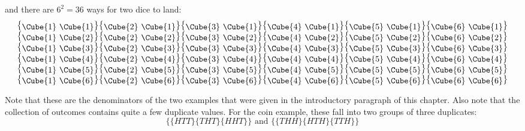 \noindent and there are $6^2=36$ ways for two dice to land:
\[
\begin{array}{c}
\mbox{ \big\{\raisebox{-2pt}{\Cube{1}
    \Cube{1}}\big\}\big\{\raisebox{-2pt}{\Cube{2}
    \Cube{1}}\big\}\big\{\raisebox{-2pt}{\Cube{3}
    \Cube{1}}\big\}\big\{\raisebox{-2pt}{\Cube{4}
    \Cube{1}}\big\}\big\{\raisebox{-2pt}{\Cube{5}
    \Cube{1}}\big\}\big\{\raisebox{-2pt}{\Cube{6} \Cube{1}}\big\}
}\\ \mbox{ \big\{\raisebox{-2pt}{\Cube{1}
    \Cube{2}}\big\}\big\{\raisebox{-2pt}{\Cube{2}
    \Cube{2}}\big\}\big\{\raisebox{-2pt}{\Cube{3}
    \Cube{2}}\big\}\big\{\raisebox{-2pt}{\Cube{4}
    \Cube{2}}\big\}\big\{\raisebox{-2pt}{\Cube{5}
    \Cube{2}}\big\}\big\{\raisebox{-2pt}{\Cube{6} \Cube{2}}\big\}
}\\ \mbox{ \big\{\raisebox{-2pt}{\Cube{1}
    \Cube{3}}\big\}\big\{\raisebox{-2pt}{\Cube{2}
    \Cube{3}}\big\}\big\{\raisebox{-2pt}{\Cube{3}
    \Cube{3}}\big\}\big\{\raisebox{-2pt}{\Cube{4}
    \Cube{3}}\big\}\big\{\raisebox{-2pt}{\Cube{5}
    \Cube{3}}\big\}\big\{\raisebox{-2pt}{\Cube{6} \Cube{3}}\big\}
}\\ \mbox{ \big\{\raisebox{-2pt}{\Cube{1}
    \Cube{4}}\big\}\big\{\raisebox{-2pt}{\Cube{2}
    \Cube{4}}\big\}\big\{\raisebox{-2pt}{\Cube{3}
    \Cube{4}}\big\}\big\{\raisebox{-2pt}{\Cube{4}
    \Cube{4}}\big\}\big\{\raisebox{-2pt}{\Cube{5}
    \Cube{4}}\big\}\big\{\raisebox{-2pt}{\Cube{6} \Cube{4}}\big\}
}\\ \mbox{ \big\{\raisebox{-2pt}{\Cube{1}
    \Cube{5}}\big\}\big\{\raisebox{-2pt}{\Cube{2}
    \Cube{5}}\big\}\big\{\raisebox{-2pt}{\Cube{3}
    \Cube{5}}\big\}\big\{\raisebox{-2pt}{\Cube{4}
    \Cube{5}}\big\}\big\{\raisebox{-2pt}{\Cube{5}
    \Cube{5}}\big\}\big\{\raisebox{-2pt}{\Cube{6} \Cube{5}}\big\}
}\\ \mbox{ \big\{\raisebox{-2pt}{\Cube{1}
    \Cube{6}}\big\}\big\{\raisebox{-2pt}{\Cube{2}
    \Cube{6}}\big\}\big\{\raisebox{-2pt}{\Cube{3}
    \Cube{6}}\big\}\big\{\raisebox{-2pt}{\Cube{4}
    \Cube{6}}\big\}\big\{\raisebox{-2pt}{\Cube{5}
    \Cube{6}}\big\}\big\{\raisebox{-2pt}{\Cube{6} \Cube{6}}\big\}
}
\end{array}\]
    
Note that these are the denominators of the two examples that were
given in the introductory paragraph of this chapter. Also note that
the collection of outcomes contains quite a few duplicate values.  For
the coin example, these fall into two groups of three duplicates:
\[\{\{HTT\}\{THT\}\{HHT\}\} \mbox{~and~} \{\{THH\}\{HTH\}\{TTH\}\}\]

